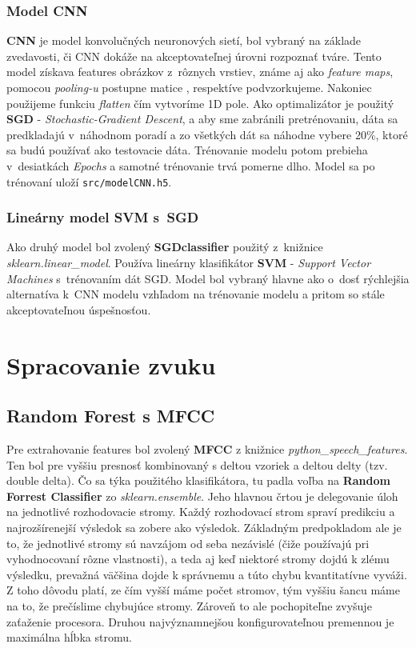 \documentclass[11pt, a4paper]{article}
\begin{document}
\subsubsection{Model CNN}
\textbf{CNN} je model konvolučných neuronových sietí, bol vybraný na základe zvedavosti, či CNN dokáže na akceptovateľnej úrovni rozpoznať tváre. Tento model získava features obrázkov z~rôznych vrstiev, známe aj ako \emph{feature maps}, pomocou \emph{pooling-u} postupne matice , respektíve podvzorkujeme. Nakoniec použijeme funkciu \emph{flatten} čím vytvoríme 1D pole. Ako optimalizátor je použitý \textbf{SGD} - \emph{Stochastic-Gradient Descent}, a aby sme zabránili pretrénovaniu, dáta sa predkladajú v~náhodnom poradí a zo všetkých dát sa náhodne vybere 20\%, ktoré sa budú používať ako testovacie dáta. Trénovanie modelu potom prebieha v~desiatkách \emph{Epochs} a samotné trénovanie trvá pomerne dlho. Model sa po trénovaní uloží \texttt{src/modelCNN.h5}.
\subsubsection{Lineárny model SVM s~SGD}
Ako druhý model bol zvolený \textbf{SGDclassifier} použitý z~knižnice \emph{sklearn.linear\_model}. Používa lineárny klasifikátor \textbf{SVM} - \emph{Support Vector Machines} s~trénovaním dát SGD. Model bol vybraný hlavne ako o~dosť rýchlejšia alternatíva k~CNN modelu vzhľadom na trénovanie modelu a pritom so stále akceptovateľnou úspešnosťou.
	\section{Spracovanie zvuku}
			\subsection{Random Forest s MFCC}
			Pre extrahovanie features bol zvolený \textbf{MFCC} z knižnice \emph{python\_speech\_features}. Ten bol pre vyššiu presnosť kombinovaný s deltou vzoriek a deltou delty (tzv. double delta).
			Čo sa týka použitého klasifikátora, tu padla voľba na \textbf{Random Forrest Classifier} zo \emph{sklearn.ensemble}. Jeho hlavnou črtou je delegovanie úloh na jednotlivé rozhodovacie stromy. Každý rozhodovací strom spraví predikciu a najrozšírenejší výsledok sa zobere ako výsledok. Základným predpokladom ale je to, že jednotlivé stromy sú navzájom od seba nezávislé (čiže používajú pri vyhodnocovaní rôzne vlastnosti), a teda aj keď niektoré stromy dojdú k zlému výsledku, prevažná väčšina dojde k správnemu a túto chybu kvantitatívne vyváži. Z toho dôvodu platí, ze čím vyšší máme počet stromov, tým vyššiu šancu máme na to, že prečíslime chybujúce stromy. Zároveň to ale pochopiteľne zvyšuje zaťaženie procesora. Druhou najvýznamnejšou konfigurovateľnou premennou je maximálna hĺbka stromu.
\end{document}
